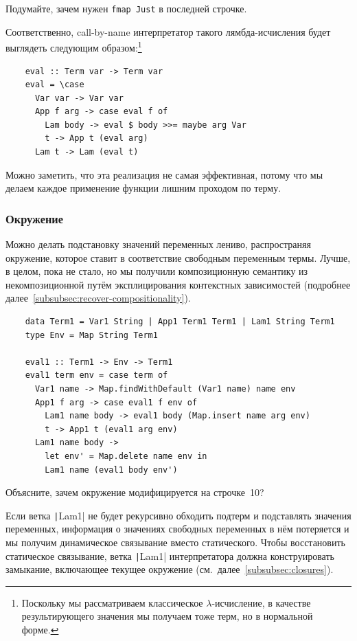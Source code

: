 \begin{task}
    Подумайте, зачем нужен \texttt{fmap Just} в последней строчке.
\end{task}

Соответственно, call-by-name интерпретатор такого лямбда-исчисления будет выглядеть следующим образом:\footnote{Поскольку мы рассматриваем классическое $\lambda$-исчисление, в качестве результирующего значения мы получаем тоже терм, но в нормальной форме.}

\begin{verbatim}
    eval :: Term var -> Term var
    eval = \case
      Var var -> Var var
      App f arg -> case eval f of
        Lam body -> eval $ body >>= maybe arg Var
        t -> App t (eval arg)
      Lam t -> Lam (eval t)
\end{verbatim}

Можно заметить, что эта реализация не самая эффективная, потому что мы делаем каждое применение функции лишним проходом по терму.

\subsubsection{Окружение}

Можно делать подстановку значений переменных лениво, распространяя окружение, которое ставит в соответствие свободным переменным термы.
Лучше, в целом, пока не стало, но мы получили композиционную семантику из некомпозиционной путём эксплицирования контекстных зависимостей (подробнее далее~\ref{subsubsec:recover-compositionality}).

\begin{verbatim}
    data Term1 = Var1 String | App1 Term1 Term1 | Lam1 String Term1
    type Env = Map String Term1

    eval1 :: Term1 -> Env -> Term1
    eval1 term env = case term of
      Var1 name -> Map.findWithDefault (Var1 name) name env
      App1 f arg -> case eval1 f env of
        Lam1 name body -> eval1 body (Map.insert name arg env)
        t -> App1 t (eval1 arg env)
      Lam1 name body ->
        let env' = Map.delete name env in
        Lam1 name (eval1 body env')
\end{verbatim}

\begin{task}
    Объясните, зачем окружение модифицируется на строчке~10?
\end{task}

Если ветка \texttt|Lam1| не будет рекурсивно обходить подтерм и подставлять значения переменных, информация о значениях свободных переменных в нём потеряется и мы получим динамическое связывание вместо статического.
Чтобы восстановить статическое связывание, ветка \texttt|Lam1| интерпретатора должна конструировать замыкание, включающее текущее окружение (см.\ далее~\ref{subsubsec:closures}).

